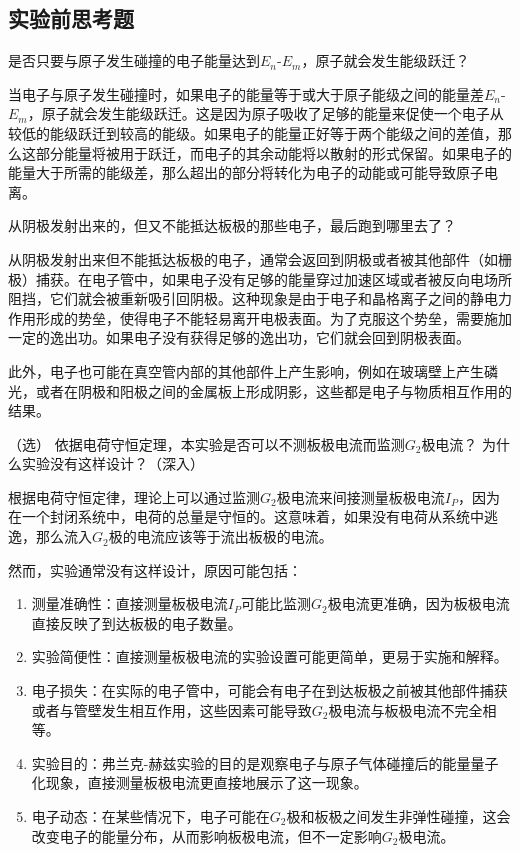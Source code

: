 \documentclass[dvipsnames, svgnames,a4paper,11pt]{article}
\begin{document}
\subsection{实验前思考题}

\begin{question}
	是否只要与原子发生碰撞的电子能量达到$E_n$-$E_m$，原子就会发生能级跃迁？
\end{question}

	当电子与原子发生碰撞时，如果电子的能量等于或大于原子能级之间的能量差$E_n$-$E_m$，原子就会发生能级跃迁。这是因为原子吸收了足够的能量来促使一个电子从较低的能级跃迁到较高的能级。如果电子的能量正好等于两个能级之间的差值，那么这部分能量将被用于跃迁，而电子的其余动能将以散射的形式保留。如果电子的能量大于所需的能级差，那么超出的部分将转化为电子的动能或可能导致原子电离。
	

\begin{question}
	从阴极发射出来的，但又不能抵达板极的那些电子，最后跑到哪里去了？
\end{question}

	从阴极发射出来但不能抵达板极的电子，通常会返回到阴极或者被其他部件（如栅极）捕获。在电子管中，如果电子没有足够的能量穿过加速区域或者被反向电场所阻挡，它们就会被重新吸引回阴极。这种现象是由于电子和晶格离子之间的静电力作用形成的势垒，使得电子不能轻易离开电极表面。为了克服这个势垒，需要施加一定的逸出功。如果电子没有获得足够的逸出功，它们就会回到阴极表面。

	此外，电子也可能在真空管内部的其他部件上产生影响，例如在玻璃壁上产生磷光，或者在阴极和阳极之间的金属板上形成阴影，这些都是电子与物质相互作用的结果。



\begin{question}
	（选） 依据电荷守恒定理，本实验是否可以不测板极电流而监测$ G_2 $极电流？ 为什么实验没有这样设计？（深入）
\end{question}

	根据电荷守恒定律，理论上可以通过监测$ G_2 $极电流来间接测量板极电流$I_P$，因为在一个封闭系统中，电荷的总量是守恒的。这意味着，如果没有电荷从系统中逃逸，那么流入$ G_2 $极的电流应该等于流出板极的电流。

	然而，实验通常没有这样设计，原因可能包括：
	
	\begin{enumerate}
		\item 测量准确性：直接测量板极电流$I_P$可能比监测$ G_2 $极电流更准确，因为板极电流直接反映了到达板极的电子数量。
		\item 实验简便性：直接测量板极电流的实验设置可能更简单，更易于实施和解释。
		\item 电子损失：在实际的电子管中，可能会有电子在到达板极之前被其他部件捕获或者与管壁发生相互作用，这些因素可能导致$ G_2 $极电流与板极电流不完全相等。
		\item 实验目的：弗兰克-赫兹实验的目的是观察电子与原子气体碰撞后的能量量子化现象，直接测量板极电流更直接地展示了这一现象。
		\item 电子动态：在某些情况下，电子可能在$ G_2 $极和板极之间发生非弹性碰撞，这会改变电子的能量分布，从而影响板极电流，但不一定影响$ G_2 $极电流。
	\end{enumerate}
	
\end{document}
